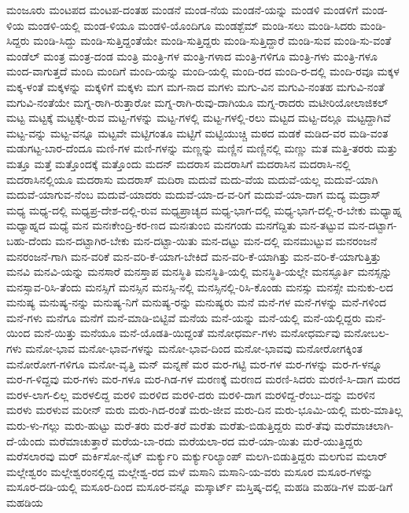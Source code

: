 {ಮಂಜೂರು
ಮಂಟಪದ
ಮಂಟಪ-ದಂತಹ
ಮಂಡನೆ
ಮಂಡ-ನೆಯ
ಮಂಡನೆ-ಯನ್ನು
ಮಂಡಳಿ
ಮಂಡಳಿಗೆ
ಮಂಡ-ಳಿಯ
ಮಂಡಳಿ-ಯಲ್ಲಿ
ಮಂಡ-ಳಿಯೂ
ಮಂಡಳಿ-ಯೊಂದಿಗೂ
ಮಂಡಶ್ಬೆಮ್
ಮಂಡಿ-ಸಲು
ಮಂಡಿ-ಸಿದರು
ಮಂಡಿ-ಸಿದ್ದರು
ಮಂಡಿ-ಸಿದ್ದು
ಮಂಡಿ-ಸುತ್ತಿದ್ದಂತೆಯೇ
ಮಂಡಿ-ಸುತ್ತಿದ್ದರು
ಮಂಡಿ-ಸುತ್ತಿದ್ದಾರೆ
ಮಂಡಿ-ಸುವ
ಮಂಡಿ-ಸು-ವಂತೆ
ಮಂಡೆಲ್
ಮಂತ್ರ
ಮಂತ್ರ-ದಂಡ
ಮಂತ್ರಿ
ಮಂತ್ರಿ-ಗಳ
ಮಂತ್ರಿ-ಗಳಾದ
ಮಂತ್ರಿ-ಗಳಿಗೂ
ಮಂತ್ರಿ-ಗಳು
ಮಂತ್ರಿ-ಗಳೂ
ಮಂದ-ವಾಗುತ್ತದೆ
ಮಂದಿ
ಮಂದಿಗೆ
ಮಂದಿ-ಯನ್ನು
ಮಂದಿ-ಯಲ್ಲಿ
ಮಂದಿ-ರದ
ಮಂದಿ-ರ-ದಲ್ಲಿ
ಮಂದಿ-ರವೂ
ಮಕ್ಕಳ
ಮಕ್ಕ-ಳಂತೆ
ಮಕ್ಕಳನ್ನು
ಮಕ್ಕಳಿಗೆ
ಮಕ್ಕಳು
ಮಗ
ಮಗ-ನಾದ
ಮಗಳು
ಮಗು-ವಿನ
ಮಗುವಿ-ನಂತಹ
ಮಗುವಿ-ನಂತೆ
ಮಗುವಿ-ನಂತೆಯೇ
ಮಗ್ನ-ರಾಗಿ-ರುತ್ತಾರೋ
ಮಗ್ನ-ರಾಗಿ-ರುವು-ದಾಗಿಯೂ
ಮಗ್ನ-ರಾದರು
ಮಟೀರಿಯೋಲಾಜಿಕಲ್
ಮಟ್ಟ
ಮಟ್ಟಕ್ಕೆ
ಮಟ್ಟಕ್ಕೇ-ರುವ
ಮಟ್ಟ-ಗಳನ್ನು
ಮಟ್ಟ-ಗಳಲ್ಲಿ
ಮಟ್ಟ-ಗಳಲ್ಲಿ-ರಲು
ಮಟ್ಟದ
ಮಟ್ಟ-ದಲ್ಲೂ
ಮಟ್ಟದ್ದಾಗಿವೆ
ಮಟ್ಟ-ವನ್ನು
ಮಟ್ಟ-ವನ್ನೂ
ಮಟ್ಟವೇ
ಮಟ್ಟಿಗಂತೂ
ಮಟ್ಟಿಗೆ
ಮಟ್ಟಿಯುಚ್ಚಿ
ಮಠದ
ಮಡಕೆ
ಮಡಿದ-ವರ
ಮಡಿ-ವಂತ
ಮಡುಗಟ್ಟ-ಬಾರ-ದೆಂದೂ
ಮಣಿ-ಗಳ
ಮಣಿ-ಗಳನ್ನು
ಮಣ್ಣನ್ನು
ಮಣ್ಣಿನ
ಮಣ್ಣಿನಲ್ಲಿ
ಮಣ್ಣು
ಮತ
ಮತ್ತಿ-ತರರು
ಮತ್ತು
ಮತ್ತೂ
ಮತ್ತೆ
ಮತ್ತೊಂದಕ್ಕೆ
ಮತ್ತೊಂದು
ಮದನ್
ಮದರಾಸ
ಮದರಾಸಿಗೆ
ಮದರಾಸಿನ
ಮದರಾಸಿ-ನಲ್ಲಿ
ಮದರಾಸಿನಲ್ಲಿಯೂ
ಮದರಾಸು
ಮದರಾಸ್
ಮದಿರಾ
ಮದುವೆ
ಮದು-ವೆಯ
ಮದುವೆ-ಯಲ್ಲ
ಮದುವೆ-ಯಾಗಿ
ಮದುವೆ-ಯಾಗುವ-ನೆಂಬ
ಮದುವೆ-ಯಾದರು
ಮದುವೆ-ಯಾ-ದ-ವ-ರಿಗೆ
ಮದುವೆ-ಯಾ-ದಾಗ
ಮದ್ಯ
ಮದ್ರಾಸ್
ಮಧ್ಯ
ಮಧ್ಯ-ದಲ್ಲಿ
ಮಧ್ಯಪ್ರ-ದೇಶ-ದಲ್ಲಿ-ರುವ
ಮಧ್ಯಪ್ರಾಚ್ಯದ
ಮಧ್ಯ-ಭಾಗ-ದಲ್ಲಿ
ಮಧ್ಯ-ಭಾಗ-ದಲ್ಲಿ-ರ-ಬೇಕು
ಮಧ್ಯಾಹ್ನ
ಮಧ್ಯಾಹ್ನದ
ಮಧ್ಯೆ
ಮನ
ಮನಃಕೇಂದ್ರಿ-ಕರ-ಣದ
ಮನಃತುಂಬಿ
ಮನಗಂಡು
ಮನಗೆದ್ದಿತು
ಮನ-ತಟ್ಟುವ
ಮನ-ದಟ್ಟಾಗ-ಬಹು-ದೆಂದು
ಮನ-ದಟ್ಟಾಗಿರ-ಬೇಕು
ಮನ-ದಟ್ಟಾ-ಯಿತು
ಮನ-ದಟ್ಟು
ಮನ-ದಲ್ಲಿ
ಮನಮುಟ್ಟುವ
ಮನರಂಜನೆ
ಮನರಂಜನೆ-ಗಾಗಿ
ಮನ-ವರಿಕೆ
ಮನ-ವರಿ-ಕೆ-ಯಾಗ-ಬೇಕಿದೆ
ಮನ-ವರಿ-ಕೆ-ಯಾಗಿತ್ತು
ಮನ-ವರಿ-ಕೆ-ಯಾಗುತ್ತಿತ್ತು
ಮನವಿ
ಮನವಿ-ಯನ್ನು
ಮನಸಾರೆ
ಮನಸ್ತಾಪ
ಮನಸ್ಥಿತಿ
ಮನಸ್ಥಿತಿ-ಯಲ್ಲಿ
ಮನಸ್ಥಿತಿ-ಯಲ್ಲೇ
ಮನಸ್ಫೂರ್ತಿ
ಮನಸ್ಸನ್ನು
ಮನಸ್ಸಾವ-ರಿಸಿ-ತೆಂದು
ಮನಸ್ಸಿಗೆ
ಮನಸ್ಸಿನ
ಮನಸ್ಸಿ-ನಲ್ಲಿ
ಮನಸ್ಸಿನಲ್ಲಿ-ರಿಸಿ-ಕೊಂಡು
ಮನಸ್ಸು
ಮನಸ್ಸೇ
ಮನುಕು-ಲದ
ಮನುಷ್ಯ
ಮನುಷ್ಯ-ನನ್ನು
ಮನುಷ್ಯ-ನಿಗೆ
ಮನುಷ್ಯ-ರನ್ನು
ಮನುಷ್ಯರು
ಮನೆ
ಮನೆ-ಗಳ
ಮನೆ-ಗಳನ್ನು
ಮನೆ-ಗಳಿಂದ
ಮನೆ-ಗಳು
ಮನೆಗೂ
ಮನೆಗೆ
ಮನೆ-ಮಾಡಿ-ಬಿಟ್ಟಿವೆ
ಮನೆಯ
ಮನೆ-ಯನ್ನು
ಮನೆ-ಯಲ್ಲಿ
ಮನೆ-ಯಲ್ಲಿದ್ದರು
ಮನೆ-ಯಿಂದ
ಮನೆ-ಯಿತ್ತು
ಮನೆಯೂ
ಮನೆ-ಯೊಡತಿ-ಯಿದ್ದಂತೆ
ಮನೋಧರ್ಮ-ಗಳು
ಮನೋಧರ್ಮವು
ಮನೋಬಲ-ಗಳು
ಮನೋ-ಭಾವ
ಮನೋ-ಭಾವ-ಗಳನ್ನು
ಮನೋ-ಭಾವ-ದಿಂದ
ಮನೋ-ಭಾವವು
ಮನೋರೋಗಕ್ಕಿಂತ
ಮನೋರೋಗ-ಗಳಿಗೂ
ಮನೋ-ವೃತ್ತಿ
ಮನ್
ಮನ್ನಣೆ
ಮರ
ಮರ-ಗಟ್ಟಿ
ಮರ-ಗಳ
ಮರ-ಗಳನ್ನು
ಮರ-ಗ-ಳನ್ನೂ
ಮರ-ಗ-ಳಿದ್ದವು
ಮರ-ಗಳು
ಮರ-ಗಳೂ
ಮರ-ಗಿಡ-ಗಳ
ಮರಣಕ್ಕೆ
ಮರಣದ
ಮರಣಿ-ಸಿದರು
ಮರಣಿ-ಸಿ-ದಾಗ
ಮರದ
ಮರಳ-ಲಾಗ-ಲಿಲ್ಲ
ಮರಳಲಿದ್ದ
ಮರಳಿ
ಮರಳಿದ
ಮರಳಿ-ದರು
ಮರಳಿ-ದಾಗ
ಮರಳಿದ್ದ-ರೆಂಬು-ದನ್ನು
ಮರಳಿನ
ಮರಳು
ಮರಳುವ
ಮರೀನ್
ಮರು
ಮರು-ಗಿದ-ರಂತೆ
ಮರು-ಜೀವ
ಮರು-ದಿನ
ಮರು-ಭೂಮಿ-ಯಲ್ಲಿ
ಮರು-ಮಾತಿಲ್ಲ
ಮರು-ಳು-ಗಲ್ಲು
ಮರು-ಹುಟ್ಟು
ಮರೆ-ತರು
ಮರೆ-ತರೆ
ಮರೆತು
ಮರೆತು-ಬಿಡುತ್ತಿದ್ದರು
ಮರೆ-ತೆವು
ಮರೆಮಾಚಲಾಗಿ-ದೆ-ಯೆಂದು
ಮರೆಮಾಚುತ್ತಾರೆ
ಮರೆಯ-ಬಾ-ರದು
ಮರೆಯಲಾ-ರದ
ಮರೆ-ಯಾ-ಯಿತು
ಮರೆ-ಯುತ್ತಿದ್ದರು
ಮರೆಸಲಾರವು
ಮರ್
ಮರ್ಕಿಸೋ-ನೈಟ್
ಮರ್ಕ್ಯುರಿ
ಮರ್ಕ್ಯುರಿಲ್ಯಾಂಪ್
ಮಲಗಿ-ಬಿಡುತ್ತಿದ್ದರು
ಮಲಗುವ
ಮಲಾರ್
ಮಲ್ಲೇಶ್ವರಂ
ಮಲ್ಲೇಶ್ವರಂನಲ್ಲಿದ್ದ
ಮಲ್ಲೇಶ್ವ-ರದ
ಮಳೆ
ಮಸಾನಿ
ಮಸಾನಿ-ಯ-ವರು
ಮಸೂರ
ಮಸೂರ-ಗಳನ್ನು
ಮಸೂರ-ದಡಿ-ಯಲ್ಲಿ
ಮಸೂರ-ದಿಂದ
ಮಸೂರ-ವನ್ನೂ
ಮಸ್ಕಾರ್ಟ್
ಮಸ್ತಿಷ್ಕ-ದಲ್ಲಿ
ಮಹಡಿ
ಮಹಡಿ-ಗಳ
ಮಹ-ಡಿಗೆ
ಮಹಡಿಯ
}
